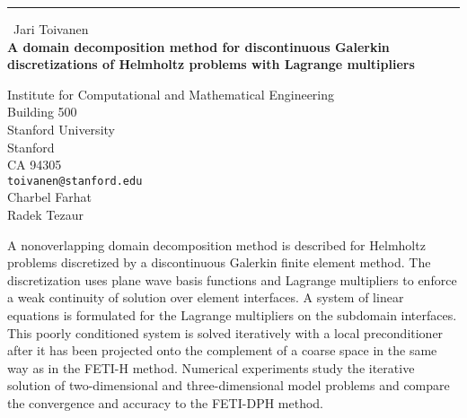 \documentclass{report}
\begin{document}
\begin{center}
\rule{6in}{1pt} \
{\large Jari Toivanen \\
{\bf A domain decomposition method for discontinuous Galerkin discretizations of Helmholtz problems with Lagrange multipliers}}

Institute for Computational and Mathematical Engineering \\ Building 500 \\ Stanford University \\ Stanford \\ CA 94305
\\
{\tt toivanen@stanford.edu}\\
Charbel Farhat\\
Radek Tezaur\end{center}

A nonoverlapping domain decomposition method is described for Helmholtz
problems discretized by a discontinuous Galerkin finite element method.
The discretization uses plane wave basis functions and Lagrange
multipliers to enforce a weak continuity of solution over element
interfaces. A system of linear equations is formulated for the Lagrange
multipliers on the subdomain interfaces. This poorly conditioned system
is solved iteratively with a local preconditioner after it has been
projected onto the complement of a coarse space in the same way as in the
FETI-H method. Numerical experiments study the iterative solution of
two-dimensional and three-dimensional model problems and compare the
convergence and accuracy to the FETI-DPH method.
\end{document}
